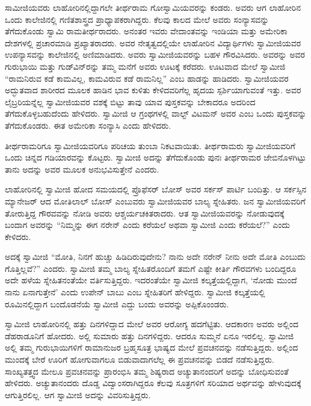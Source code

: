  ಸಾಮೀಜಿಯವರು ಲಾಹೋರಿನಲ್ಲಿದ್ದಾಗಲೇ ತೀರ್ಥರಾಮ ಗೋಸ್ವಾಮಿಯವರನ್ನು ಕಂಡರು. ಅವರು ಆಗ ಲಾಹೋರಿನ ಒಂದು ಕಾಲೇಜಿನಲ್ಲಿ ಗಣಿತಶಾಸ್ತ್ರದ ಪ್ರಾಧ್ಯಾಪಕರಾಗಿದ್ದರು. ಕೆಲವು ಕಾಲದ ಮೇಲೆ ಅವರು ಸಂನ್ಯಾಸವನ್ನು ತೆಗೆದುಕೊಂಡು ಸ್ವಾಮಿ ರಾಮತೀರ್ಥರಾದರು. ಅನಂತರ ಇವರು ವೇದಾಂತವನ್ನು ಇಂಡಿಯಾ ಮತ್ತು ಅಮೇರಿಕಾ ದೇಶಗಳಲ್ಲಿ ಪ್ರಚಾರಮಾಡಿ ಪ್ರಖ್ಯಾತರಾದರು. ಅವರ ನೇತೃತ್ವದಲ್ಲಿಯೇ ಲಾಹೋರಿನ ವಿದ್ಯಾರ್ಥಿಗಳು ಸ್ವಾಮೀಜಿಯವರ ಉಪನ್ಯಾಸವನ್ನು ಕಾಲೇಜಿನಲ್ಲಿ ಅಣಿಮಾಡಿದರು. ಅವರು ಸ್ವಾಮೀಜಿಯವರನ್ನು ಬಹಳ ಗೌರವಿಸಿದರು. ಅವರನ್ನು ಅವರ ಗುರುಭಾಯಿ ಮತ್ತು ಗುಡ್‍ವಿನ್​ರನ್ನು ತಮ್ಮ ಮನೆಗೆ ಅವರು ಊಟಕ್ಕೆ ಕರೆದರು. ಊಟವಾದ ಮೇಲೆ ಸ್ವಾಮೀಜಿ “ರಾಮನಿರುವ ಕಡೆ ಕಾಮವಿಲ್ಲ, ಕಾಮವಿರುವ ಕಡೆ ರಾಮನಿಲ್ಲ” ಎಂಬ ಹಾಡನ್ನು ಹಾಡಿದರು. ಸ್ವಾಮೀಜಿಯವರ ಅದ್ಭುತವಾದ ಶಾರೀರದ ಮೂಲಕ ಹಾಡಿನ ಭಾವ ಕುಳಿತು ಕೇಳಿದವರಿಗೆಲ್ಲ ಹೃದಯ ಸ್ಪರ್ಶಿಯಾಗುವಂತೆ ಇತ್ತು. ಅವರ ಲೈಬ್ರರಿಯನ್ನೆಲ್ಲ ಸ್ವಾಮೀಜಿಯವರ ವಶಕ್ಕೆ ಬಿಟ್ಟು ತಾವು ಯಾವ ಪುಸ್ತಕವನ್ನು ಬೇಕಾದರೂ ಅದರಿಂದ ತೆಗೆದುಕೊಳ್ಳಬಹುದೆಂದು ಹೇಳಿದರು. ಸ್ವಾಮೀಜಿ ಆ ಗ್ರಂಥಗಳಲ್ಲಿ ವಾಲ್ಟ್ ವಿಟಮನ್ ಅವರ  ಎಂಬ ಒಂದು ಪುಸ್ತಕವನ್ನು ತೆಗೆದುಕೊಂಡರು. ಈತ ಅಮೇರಿಕಾ ಸಂನ್ಯಾಸಿ ಎಂದು ಹೇಳಿದರು. 

 ತೀರ್ಥರಾಮರಿಗೂ ಸ್ವಾಮೀಜಿಯವರಿಗೂ ಪರಿಚಯ ತುಂಬಾ ನಿಕಟವಾಯಿತು. ತೀರ್ಥರಾಮರು ಸ್ವಾಮೀಜಿಯವರಿಗೆ ಒಂದು ಚಿನ್ನದ ಗಡಿಯಾರವನ್ನು ಕೊಟ್ಟರು. ಸ್ವಾಮೀಜಿ ಅದನ್ನು ತೆಗೆದುಕೊಂಡು ಪುನಃ ತೀರ್ಥರಾಮರ ಜೇಬಿನೊಳಗಿಟ್ಟು ತಾನು ಅದನ್ನು ಅವರ ಮೂಲಕ ಅನುಭವಿಸುತ್ತೇನೆ ಎಂದರು. 

 ಲಾಹೋರಿನಲ್ಲಿ ಸ್ವಾಮೀಜಿ ಹೋದ ಸಮಯದಲ್ಲಿ ಪ್ರೊಫೆಸರ್ ಬೋಸ್ ಅವರ ಸರ್ಕಸ್ ಪಾರ್ಟಿ ಬಂದಿತ್ತು. ಆ ಸರ್ಕಸ್ಸಿನ ಮ್ಯಾನೇಜರ್ ಆದ ಮೋತಿಲಾಲ್ ಬೋಸ್ ಎಂಬುವರು ಸ್ವಾಮೀಜಿಯವರ ಬಾಲ್ಯ ಸ್ನೇಹಿತರು. ಜನ ಸ್ವಾಮೀಜಿಯವರಿಗೆ ತೋರುತ್ತಿದ್ದ ಗೌರವವನ್ನು ನೋಡಿ ಅವರು ಆಶ್ಚರ್ಯಚಕಿತರಾದರು. ಆತ ಸ್ವಾಮೀಜಿಯವರನ್ನು ನೋಡುವುದಕ್ಕೆ ಬಂದಾಗ ಅವರನ್ನು “ನಿಮ್ಮನ್ನು ಈಗ ನರೇನ್ ಎಂದು ಕರೆಯಲೆ ಅಥವಾ ಸ್ವಾಮೀಜಿ ಎಂದು ಕರೆಯಲೆ?” ಎಂದು ಕೇಳಿದರು. 

 ಅದಕ್ಕೆ ಸ್ವಾಮೀಜಿ “ಮೋತಿ, ನಿನಗೆ ಹುಚ್ಚು ಹಿಡಿದಿರುವುದೇನು? ನಾನು ಅದೇ ನರೇನ್ ನೀನು ಅದೇ ಮೋತಿ ಎಂಬುದು ಗೊತ್ತಿಲ್ಲವೆ?” ಎಂದರು. ಸ್ವಾಮೀಜಿ ತಮ್ಮ ಬಾಲ್ಯ ಸ್ನೇಹಿತರೊಂದಿಗೆ ತಮಗೆ ಎಷ್ಟೇ ಕೀರ್ತಿ ಗೌರವಗಳು ಬಂದಿದ್ದರೂ ಅದೇ ಹಳೆಯ ಸ್ನೇಹಿತನಂತೆಯೇ ವರ್ತಿಸುತ್ತಿದ್ದರು. ಇದರಂತೆಯೇ ಸ್ವಾಮೀಜಿ ಕಲ್ಕತ್ತೆಯಲ್ಲಿದ್ದಾಗ, ‘ನೋಡು ಮುಂದೆ ನಾನು ಏನಾಗುತ್ತೇನೆ’ ಎಂದು ಉಪೇನ್ ಬಾಬು ಎಂಬ ಸ್ನೇಹಿತರಿಗೆ ಹೇಳಿದ್ದರು. ಸ್ವಾಮೀಜಿ ಕಲ್ಕತ್ತೆಯಲ್ಲಿ ರೂಮಿನಲ್ಲಿದ್ದಾಗ ಬಂದೊಡನೆಯೆ ಸ್ವಾಮೀಜಿ ಎದ್ದು ಬಂದು ಅವರನ್ನು ಅಪ್ಪಿಕೊಂಂಡರು. 

 ಸ್ವಾಮೀಜಿ ಲಾಹೋರಿನಲ್ಲಿ ಹತ್ತು ದಿನಗಳಿದ್ದಾದ ಮೇಲೆ ಅವರ ಆರೋಗ್ಯ ಹದಗೆಟ್ಟಿತು. ಆದಕಾರಣ ಅವರು ಅಲ್ಲಿಂದ ಡೆಹರಾಡೂನಿಗೆ ಹೋದರು. ಅಲ್ಲಿ ಸುಮಾರು ಹತ್ತು ದಿನಗಳಿದ್ದರು. ಆದರೂ ಸುಮ್ಮನೆ ಏನೂ ಇರಲಿಲ್ಲ. ಸ್ವಾಮೀಜಿ ಅಲ್ಲಿ ತಮ್ಮ ಗುರುಭಾಯಿಗಳಿಗೆ ರಾಮಾನುಜರ ಬ್ರಹ್ಮಸೂತ್ರ ಭಾಷ್ಯದ ಮೇಲೆ ಪ್ರವಚನವನ್ನು ನಡೆಸುತ್ತಿದ್ದರು. ಅಲ್ಲಿಂದ ಮುಂದಕ್ಕೆ ಬೇರೆ ಊರಿಗೆ ಹೋಗುವಾಗಲೂ ಬಿಡುವಾದಾಗಲೆಲ್ಲ ಈ ಪ್ರವಚನವನ್ನು ಬಿಡದೆ ನಡೆಸುತ್ತಿದ್ದರು. ಸಾಂಖ್ಯತತ್ತ್ವದ ಮೇಲೂ ಪ್ರವಚನವನ್ನು ಪ್ರಾರಂಭಿಸಿ ತಮ್ಮ ಶಿಷ್ಯರಾದ ಅಚ್ಯುತಾನಂದರಿಗೆ ಅದನ್ನು ಬೋಧಿಸುವಂತೆ ಹೇಳಿದರು. ಅಚ್ಯುತಾನಂದರು ದೊಡ್ಡ ವಿದ್ವಾಂಸರಾಗಿದ್ದರೂ ಕೆಲವು ಸೂತ್ರಗಳಿಗೆ ಸರಿಯಾದ ಅರ್ಥವನ್ನು ಹೇಳುವುದಕ್ಕೆ ಆಗುತ್ತಿರಲಿಲ್ಲ. ಆಗ ಸ್ವಾಮೀಜಿ ಅದನ್ನು ವಿವರಿಸುತ್ತಿದ್ದರು. 

